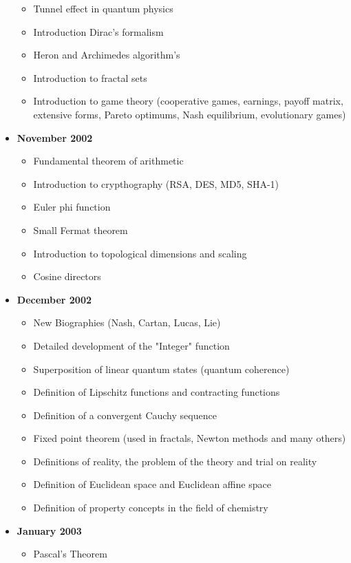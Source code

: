 \documentclass[12pt,a4paper,twoside,openright]{report}
\theoremstyle{definition}
\theoremstyle{itexmp}
\numberwithin{equation}{section}
\begin{document}
\begin{itemize}
\begin{itemize}[noitemsep]
				\item Tunnel effect in quantum physics
				\item Introduction Dirac's formalism
				\item Heron and Archimedes algorithm's
				\item Introduction to fractal sets
				\item Introduction to game theory (cooperative games, earnings, payoff matrix, extensive forms, Pareto optimums, Nash equilibrium, evolutionary games)
			\end{itemize}
			\item \textbf{November 2002}
				\begin{itemize}[noitemsep]
				\item Fundamental theorem of arithmetic
				\item Introduction to crypthography (RSA, DES, MD5, SHA-1)
				\item Euler phi function
				\item Small Fermat theorem
				\item Introduction to topological dimensions and scaling 
				\item Cosine directors
			\end{itemize}
			\item \textbf{December 2002}
				\begin{itemize}[noitemsep]
				\item New Biographies (Nash, Cartan, Lucas, Lie)
				\item Detailed development of the "Integer" function
				\item Superposition of linear quantum states (quantum coherence) 
				\item Definition of Lipschitz functions and contracting functions 
				\item Definition of a convergent Cauchy sequence 
				\item Fixed point theorem (used in fractals, Newton methods and many others)
				\item Definitions of reality, the problem of the theory and trial on reality
				\item Definition of Euclidean space and Euclidean affine space
				\item Definition of property concepts in the field of chemistry
			\end{itemize}
			\item \textbf{January 2003}
			\begin{itemize}[noitemsep]
				\item Pascal's Theorem

\end{itemize}
\end{itemize}
\end{document}
